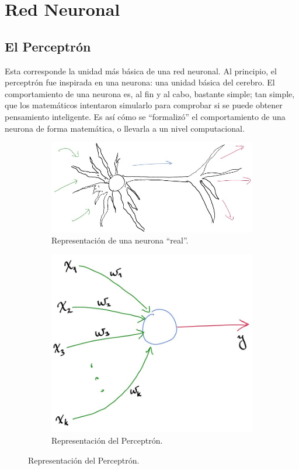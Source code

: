 \chapter{Red Neuronal}

\section{El Perceptrón}

Esta corresponde la unidad más básica de una red neuronal. Al principio, el perceptrón fue inspirada en una neurona: una unidad básica del cerebro. El comportamiento de una neurona es, al fin y al cabo, bastante simple; tan simple, que los matemáticos intentaron simularlo para comprobar si se puede obtener pensamiento inteligente. Es así cómo se ``formalizó'' el comportamiento de una neurona de forma matemática, o llevarla a un nivel computacional.
\begin{figure}
\begin{subfigure}{.47\textwidth}
    \centering
    \includegraphics[width=\linewidth]{img/img005_neu_real.jpg}
    \caption{Representación de una neurona ``real''.}
    \label{fig:neu-real}
\end{subfigure}
\begin{subfigure}{.47\textwidth}
    \centering
    \includegraphics[width=.6\linewidth]{img/img006_neu_falsa.jpg}
    \caption{Representación del Perceptrón.}
    \label{fig:neu-virt}
\end{subfigure}
\end{figure}


